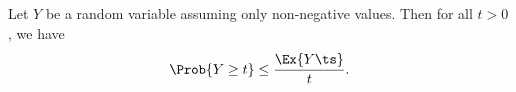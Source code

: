 \begin{theorem}
        Let $Y$ be a random variable assuming only non-negative
        values. Then for all $t >0$, we have
        \begin{equation*}
            \Prob{\bigl. Y \geq t} \leq \frac{\Ex{\bigl. Y \ts }}{t}.
        \end{equation*}
    \end{theorem}
